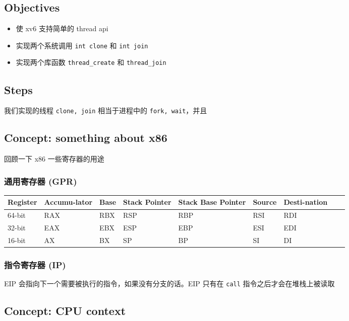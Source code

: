 \subsection{Objectives}

\begin{itemize}
    \item 使 xv6 支持简单的 thread api
    \item 实现两个系统调用 \texttt{int clone} 和 \texttt{int join}
    \item 实现两个库函数 \texttt{thread\_create} 和 \texttt{thread\_join}
\end{itemize}

\subsection{Steps}

我们实现的线程 \texttt{clone, join} 相当于进程中的 \texttt{fork, wait}，并且


\subsection{Concept: something about x86}

回顾一下 x86 一些寄存器的用途

\subsubsection{通用寄存器 (GPR)}

\noindent
\begin{tabularx}{\textwidth}{|X|X|X|X|X|X|X|X|X|}
    \hline
    Register & Accumu-lator  &Base &Stack Pointer & Stack Base Pointer & Source & Desti-nation \\ \hline
    64-bit & RAX & RBX & RSP & RBP & RSI & RDI \\ \hline
    32-bit & EAX & EBX & ESP & EBP & ESI & EDI \\ \hline
    16-bit & AX & BX & SP & BP & SI & DI \\ \hline
\end{tabularx}

\subsubsection{指令寄存器 (IP)}

EIP 会指向下一个需要被执行的指令，如果没有分支的话。EIP 只有在 \texttt{call} 指令之后才会在堆栈上被读取

\subsection{Concept: CPU context}

